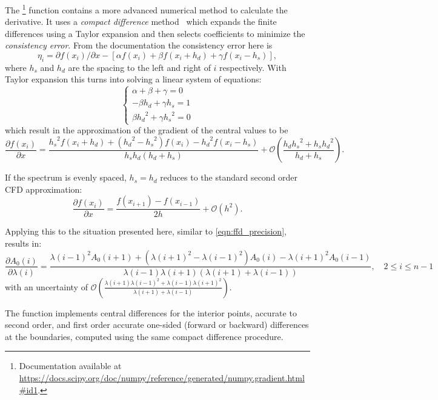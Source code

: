 The \npgradient{}\footnote{Documentation available at \href{https://docs.scipy.org/doc/numpy/reference/generated/numpy.gradient.html\#id1 }{https://docs.scipy.org/doc/numpy/reference/generated/numpy.gradient.html\#id1}.} function contains a more advanced numerical method to calculate the derivative.
It uses a \textit{compact difference} method~\citep{quarteroni_numerical_2000} which expands the finite differences using a Taylor expansion and then selects coefficients to minimize the \textit{consistency error}.
From the \numpy{} documentation the consistency error here is \[\eta_i = \partial{f(x_i)}/\partial{x} -  [\alpha f(x_i) + \beta f(x_i +h_d) + \gamma f(x_i - h_s)],\] where \(h_s\) and \(h_d\) are the spacing to the left and right of \(i\) respectively.
With Taylor expansion this turns into solving a linear system of equations:
\[\begin{cases}
\alpha + \beta + \gamma = 0\\
-\beta {h_d} + \gamma {h_s} = 1\\
\beta {h_{d}}^{2} + \gamma {h_{s}}^{2} = 0
\end{cases}
\]
which result in the approximation of the gradient of the central values to be
\[\frac{\partial{f(x_i)}}{\partial{x}} = \frac{{h_{s}}^{2}f\left(x_{i} + {h_{d}}\right) + \left({h_{d}}^{2} - {h_{s}}^{2}\right)f\left(x_{i}\right) - {h_{d}}^{2}f\left(x_{i}-{h_{s}}\right)} {{h_{s}}{h_{d}}\left({h_{d}} + {h_{s}}\right)} + \mathcal{O}\left(\frac{h_{d}{h_{s}}^{2} + {h_{s}}{h_{d}}^{2}}{{h_{d}} + {h_{s}}}\right) \label{eqn:full_compact_difference}.\]

If the spectrum is evenly spaced, ${h_{s}}={h_{d}}$  reduces to the standard second order {CFD} approximation:
\[\frac{\partial{f(x_i)}}{\partial{x}} = \frac{f\left(x_{i+1}\right) - f\left(x_{i-1}\right)}{2h} + \mathcal{O}\left({h}^{2}\right).\]

Applying this to the situation presented here, similar to \cref{eqn:ffd_precision}, results in:
\[\frac{\partial {A}_{0}(i)}{\partial\lambda(i)} = \frac{{\lambda(i-1)}^{2} {A}_{0}(i+1) + ({\lambda(i+1)}^{2}-{\lambda(i-1)}^{2}) {A}_{0}(i) - {\lambda(i+1)}^{2} {A}_{0}(i-1)} {\lambda(i-1)\lambda(i+1)(\lambda(i+1) + \lambda(i-1))}, \hspace{1em} 2 \leq i \leq n-1\]
with an uncertainty of \(\mathcal{O}\left(\frac{\lambda(i+1){\lambda(i-1)}^{2} + \lambda(i-1){\lambda(i+1)}^{2}}{\lambda(i+1) + \lambda(i-1)}\right)\).

The \npgradient{} function implements central differences for the interior points, accurate to second order, and first order accurate one-sided (forward or backward) differences at the boundaries, computed using the same compact difference procedure.

